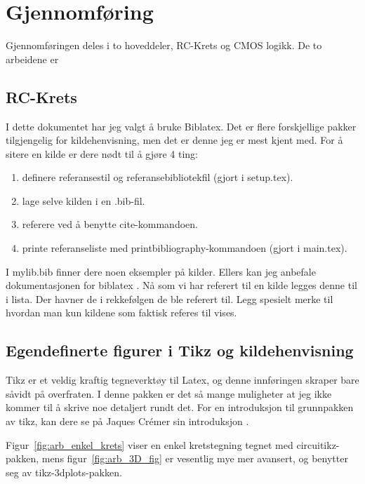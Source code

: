 \section{Gjennomføring}

Gjennomføringen deles i to hoveddeler, RC-Krets og CMOS logikk. De to arbeidene er

\subsection{RC-Krets}

I dette dokumentet har jeg valgt å bruke Biblatex. Det er flere forskjellige pakker tilgjengelig for
kildehenvisning, men det er denne jeg er mest kjent med. For å sitere en kilde er dere nødt til å gjøre 4 ting:
\begin{enumerate}
    \item definere referansestil og referansebibliotekfil (gjort i setup.tex).
    \item lage selve kilden i en .bib-fil.
    \item referere ved å benytte cite-kommandoen.
    \item printe referanseliste med printbibliography-kommandoen (gjort i main.tex).
\end{enumerate}

I mylib.bib finner dere noen eksempler på kilder. Ellers kan jeg anbefale dokumentasjonen for biblatex \cite{biblatex}.
Nå som vi har referert til en kilde legges denne til i lista. Der havner de i rekkefølgen de ble referert til.
Legg spesielt merke til hvordan man kun kildene som faktisk referes til vises. 


\newpage %
\subsection{Egendefinerte figurer i Tikz og kildehenvisning}

Tikz er et veldig kraftig tegneverktøy til Latex, og denne innføringen skraper bare såvidt på overfraten.
I denne pakken er det så mange muligheter at jeg ikke kommer til å skrive noe detaljert rundt det.
For en introduksjon til grunnpakken av tikz, kan dere se på Jaques Crémer sin introduksjon \cite{tikz_intro}.

Figur~\ref{fig:arb_enkel_krets} viser en enkel kretstegning tegnet med circuitikz-pakken, mens figur~\ref{fig:arb_3D_fig} er vesentlig mye mer avansert, og benytter seg av tikz-3dplots-pakken.

